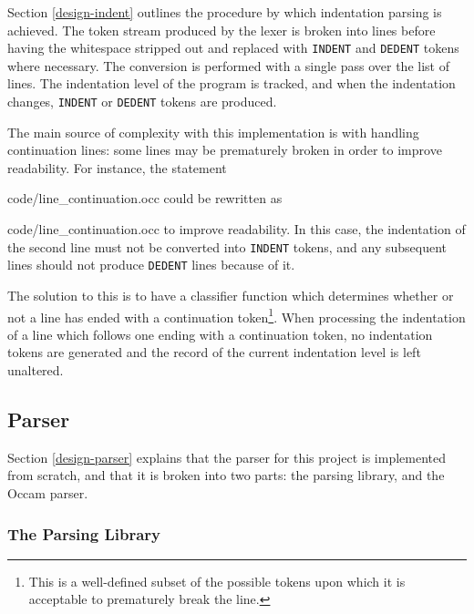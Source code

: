 Section \ref{design-indent} outlines the procedure by which indentation parsing
is achieved. The token stream produced by the lexer is broken into lines before
having the whitespace stripped out and replaced with \texttt{INDENT} and
\texttt{DEDENT} tokens where necessary. The conversion is performed with a
single pass over the list of lines. The indentation level of the program is
tracked, and when the indentation changes, \texttt{INDENT} or \texttt{DEDENT}
tokens are produced.

The main source of complexity with this implementation is with handling
continuation lines: some lines may be prematurely broken in order to improve
readability. For instance, the statement

    {code/line_continuation.occ}
could be rewritten as

    {code/line_continuation.occ}
to improve readability. In this case, the indentation of the second line must
not be converted into \texttt{INDENT} tokens, and any subsequent lines should
not produce \texttt{DEDENT} lines because of it.

The solution to this is to have a classifier function which determines whether
or not a line has ended with a continuation token\footnote{This is a
well-defined subset of the possible tokens upon which it is acceptable to
prematurely break the line.}. When processing the indentation of a line which
follows one ending with a continuation token, no indentation tokens are
generated and the record of the current indentation level is left unaltered.

\subsection{Parser}

Section \ref{design-parser} explains that the parser for this project is
implemented from scratch, and that it is broken into two parts: the parsing
library, and the Occam parser.

\subsubsection{The Parsing Library}

